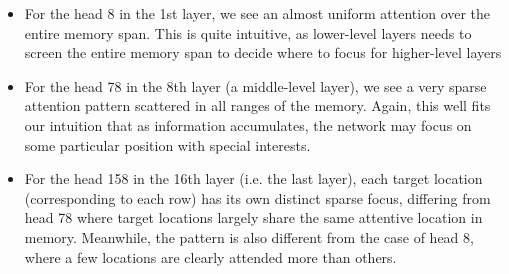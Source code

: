 \begin{itemize}[leftmargin=*]
	\item For the head 8 in the 1st layer, we see an almost uniform attention over the entire memory span. This is quite intuitive, as lower-level layers needs to screen the entire memory span to decide where to focus for higher-level layers
	\item For the head 78 in the 8th layer (a middle-level layer), we see a very sparse attention pattern scattered in all ranges of the memory. Again, this well fits our intuition that as information accumulates, the network may focus on some particular position with special interests.
	\item For the head 158 in the 16th layer (i.e. the last layer), each target location (corresponding to each row) has its own distinct sparse focus, differing from head 78 where target locations largely share the same attentive location in memory. Meanwhile, the pattern is also different from the case of head 8, where a few locations are clearly attended more than others.
\end{itemize}

